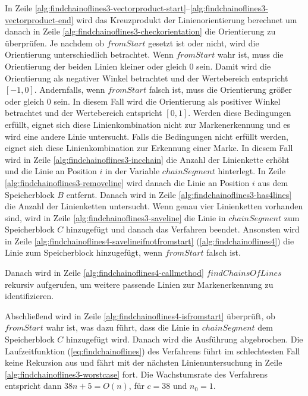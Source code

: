 In Zeile \ref{alg:findchainoflines3-vectorproduct-start}--\ref{alg:findchainoflines3-vectorproduct-end} wird das
 Kreuzprodukt der Linienorientierung berechnet um danach in Zeile \ref{alg:findchainoflines3-checkorientation} die
 Orientierung zu überprüfen. Je nachdem ob $\mathit{fromStart}$ gesetzt ist oder nicht, wird die Orientierung
 unterschiedlich betrachtet. Wenn $\mathit{fromStart}$ wahr ist, muss die Orientierung der beiden Linien kleiner oder
 gleich $0$ sein. Damit wird die Orientierung als negativer Winkel betrachtet und der Wertebereich entspricht
 $\left[-1,0\right]$. Andernfalls, wenn $\mathit{fromStart}$ falsch ist, muss die Orientierung größer oder gleich $0$
 sein. In diesem Fall wird die Orientierung als positiver Winkel betrachtet und der Wertebereich entspricht
 $\left[0,1\right]$. Werden diese Bedingungen erfüllt, eignet sich diese Linienkombination nicht zur Markenerkennung
 und es wird eine andere Linie untersucht. Falls die Bedingungen nicht erfüllt werden, eignet sich diese
 Linienkombination zur Erkennung einer Marke. In diesem Fall wird in Zeile \ref{alg:findchainoflines3-incchain} die
 Anzahl der Linienkette erhöht und die Linie an Position $i$ in der Variable $\mathit{chainSegment}$ hinterlegt. In
 Zeile \ref{alg:findchainoflines3-removeline} wird danach die Linie an Position $i$ aus dem Speicherblock $B$ entfernt.
 Danach wird in Zeile \ref{alg:findchainoflines3-has4lines} die Anzahl der Linienketten untersucht. Wenn genau vier
 Linienketten vorhanden sind, wird in Zeile \ref{alg:findchainoflines3-saveline} die Linie in $\mathit{chainSegment}$
 zum Speicherblock $C$ hinzugefügt und danach das Verfahren beendet. Ansonsten wird in Zeile
 \ref{alg:findchainoflines4-savelineifnotfromstart} (\autoref{alg:findchainoflines4}) die Linie zum Speicherblock
 hinzugefügt, wenn $\mathit{fromStart}$ falsch ist.


Danach wird in Zeile \ref{alg:findchainoflines4-callmethod} $\mathit{findChainsOfLines}$ rekursiv aufgerufen, um
 weitere passende Linien zur Markenerkennung zu identifizieren.

Abschließend wird in Zeile \ref{alg:findchainoflines4-isfromstart} überprüft, ob $\mathit{fromStart}$ wahr ist, was
 dazu führt, dass die Linie in $\mathit{chainSegment}$ dem Speicherblock $C$ hinzugefügt wird. Danach wird die
 Ausführung abgebrochen. Die Laufzeitfunktion (\autoref{eq:findchainoflines}) des Verfahrens führt im schlechtesten Fall
 keine Rekursion aus und fährt mit der nächsten Linienuntersuchung in Zeile \ref{alg:findchainoflines3-worstcase} fort.
 Die Wachstumsrate des Verfahrens entspricht dann $38n + 5 = O(n)$, für $c = 38$ und $n_{0} = 1$.


